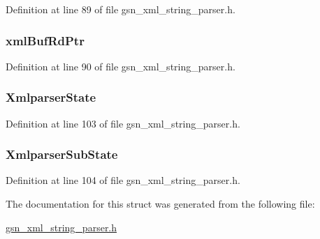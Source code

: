 Definition at line 89 of file gsn\_\-xml\_\-string\_\-parser.h.

\hypertarget{a00444_aab18734f6d9450f7384a5d3565c931b7}{
\subsubsection[{xmlBufRdPtr}]{ {\bf xmlBufRdPtr}}}
\label{a00444_aab18734f6d9450f7384a5d3565c931b7}


Definition at line 90 of file gsn\_\-xml\_\-string\_\-parser.h.

\hypertarget{a00444_aa9dbf5ff180d761f0b443a5aa1033143}{
\subsubsection[{XmlparserState}]{ {\bf XmlparserState}}}
\label{a00444_aa9dbf5ff180d761f0b443a5aa1033143}


Definition at line 103 of file gsn\_\-xml\_\-string\_\-parser.h.

\hypertarget{a00444_a48f1851598822aa260307926fedfadad}{
\subsubsection[{XmlparserSubState}]{ {\bf XmlparserSubState}}}
\label{a00444_a48f1851598822aa260307926fedfadad}


Definition at line 104 of file gsn\_\-xml\_\-string\_\-parser.h.



The documentation for this struct was generated from the following file:\begin{DoxyCompactItemize}
\item 
\hyperlink{a00617}{gsn\_\-xml\_\-string\_\-parser.h}\end{DoxyCompactItemize}
